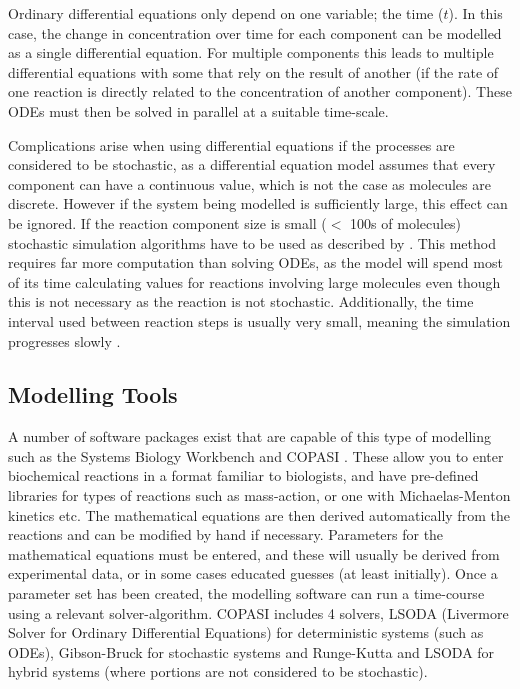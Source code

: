 Ordinary differential equations only depend on one variable; the time ($t$). In this case, the change in concentration over time for each component can be modelled as a single differential equation. For multiple components this leads to multiple differential equations with some that rely on the result of another (if the rate of one reaction is directly related to the concentration of another component). These ODEs must then be solved in parallel at a suitable time-scale.

Complications arise when using differential equations if the processes are considered to be stochastic, as a differential equation model assumes that every component can have a continuous value, which is not the case as molecules are discrete. However if the system being modelled is sufficiently large, this effect can be ignored. If the reaction component size is small ($<$ 100s of molecules) stochastic simulation algorithms have to be used as described by \citet{Gillespie1977}. This method requires far more computation than solving ODEs, as the model will spend most of its time calculating values for reactions involving large molecules even though this is not necessary as the reaction is not stochastic. Additionally, the time interval used between reaction steps is usually very small, meaning the simulation progresses slowly \cite{Klipp2005}.

\subsection{Modelling Tools}

A number of software packages exist that are capable of this type of modelling such as the Systems Biology Workbench \cite{Sauro2003} and COPASI \cite{Hoops2006}. These allow you to enter biochemical reactions in a format familiar to biologists, and have pre-defined libraries for types of reactions such as mass-action, or one with Michaelas-Menton kinetics etc. The mathematical equations are then derived automatically from the reactions and can be modified by hand if necessary. Parameters for the mathematical equations must be entered, and these will usually be derived from experimental data, or in some cases educated guesses (at least initially). Once a parameter set has been created, the modelling software can run a time-course using a relevant solver-algorithm. COPASI includes 4 solvers,  LSODA (Livermore Solver for Ordinary Differential Equations) \cite{Radhakrishnan1993} for deterministic systems (such as ODEs), Gibson-Bruck \cite{Gibson2000} for stochastic systems and Runge-Kutta and LSODA for hybrid systems (where portions are not considered to be stochastic).

